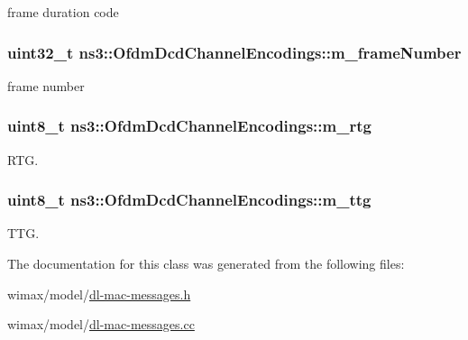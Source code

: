 frame duration code 

\subsubsection[{\texorpdfstring{m\+\_\+frame\+Number}{m_frameNumber}}]{\setlength{\rightskip}{0pt plus 5cm}uint32\+\_\+t ns3\+::\+Ofdm\+Dcd\+Channel\+Encodings\+::m\+\_\+frame\+Number\hspace{0.3cm}{\ttfamily [private]}}\hypertarget{classns3_1_1OfdmDcdChannelEncodings_aa0149a49b5de7796808bc89a1602342f}{}\label{classns3_1_1OfdmDcdChannelEncodings_aa0149a49b5de7796808bc89a1602342f}


frame number 

\subsubsection[{\texorpdfstring{m\+\_\+rtg}{m_rtg}}]{\setlength{\rightskip}{0pt plus 5cm}uint8\+\_\+t ns3\+::\+Ofdm\+Dcd\+Channel\+Encodings\+::m\+\_\+rtg\hspace{0.3cm}{\ttfamily [private]}}\hypertarget{classns3_1_1OfdmDcdChannelEncodings_af8ca00fe9ad2c476fb9afafb07cdad0f}{}\label{classns3_1_1OfdmDcdChannelEncodings_af8ca00fe9ad2c476fb9afafb07cdad0f}


R\+TG. 

\subsubsection[{\texorpdfstring{m\+\_\+ttg}{m_ttg}}]{\setlength{\rightskip}{0pt plus 5cm}uint8\+\_\+t ns3\+::\+Ofdm\+Dcd\+Channel\+Encodings\+::m\+\_\+ttg\hspace{0.3cm}{\ttfamily [private]}}\hypertarget{classns3_1_1OfdmDcdChannelEncodings_aa9d4e4da0c45006c879615575330780c}{}\label{classns3_1_1OfdmDcdChannelEncodings_aa9d4e4da0c45006c879615575330780c}


T\+TG. 



The documentation for this class was generated from the following files\+:\begin{DoxyCompactItemize}
\item 
wimax/model/\hyperlink{dl-mac-messages_8h}{dl-\/mac-\/messages.\+h}\item 
wimax/model/\hyperlink{dl-mac-messages_8cc}{dl-\/mac-\/messages.\+cc}\end{DoxyCompactItemize}
